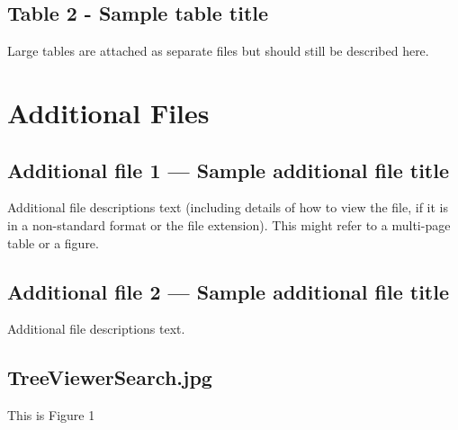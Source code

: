 \documentclass[10pt]{bmc_article}
\newenvironment{bmcformat}{\begin{raggedright}\baselineskip20pt\sloppy\setboolean{publ}{false}}{\end{raggedright}\baselineskip20pt\sloppy}
\begin{document}
\begin{bmcformat}
  \subsection*{Table 2 - Sample table title}
    Large tables are attached as separate files but should
    still be described here.




\section*{Additional Files}
  \subsection*{Additional file 1 --- Sample additional file title}
    Additional file descriptions text (including details of how to
    view the file, if it is in a non-standard format or the file extension).  This might
    refer to a multi-page table or a figure.

  \subsection*{Additional file 2 --- Sample additional file title}
    Additional file descriptions text.

  \subsection*{TreeViewerSearch.jpg}
	This is Figure 1


\end{bmcformat}
\end{document}

